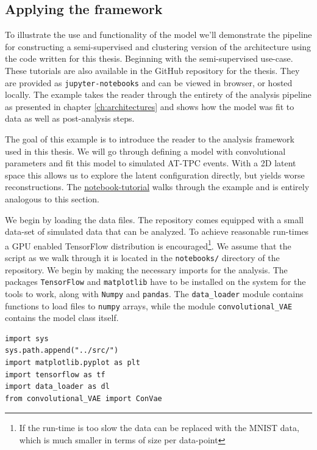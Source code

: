 \subsection{Applying the framework}

To illustrate the use and functionality of the model we'll demonstrate the pipeline for constructing a semi-supervised and clustering version of the architecture using the code written for this thesis. Beginning with the semi-supervised use-case. These tutorials are also available in the GitHub repository for the thesis. They are provided as \lstinline{jupyter-notebooks} and can be viewed in browser, or hosted locally. The example takes the reader through the entirety of the analysis pipeline as presented in chapter \ref{ch:architectures} and shows how the model was fit to data as well as post-analysis steps. 

The goal of this example is to introduce the reader to the analysis framework used in this thesis. We will go through defining a model with convolutional parameters and fit this model to simulated AT-TPC events. With a 2D latent space this allows us to explore the latent configuration directly, but yields worse reconstructions. The \href{https://GitHub.com/ATTPC/VAE-event-classification/blob/master/notebooks/simulated_tutorial.ipynb}{notebook-tutorial} walks through the example and is entirely analogous to this section.

We begin by loading the data files. The repository comes equipped with a small data-set of simulated data that can be analyzed. To achieve reasonable run-times a GPU enabled TensorFlow distribution is encouraged\footnote{If the run-time is too slow the data can be replaced with the MNIST data, which is much smaller in terms of size per data-point}. We assume that the script as we walk through it is located in the \lstinline{notebooks/} directory of the repository. We begin by making the necessary imports for the analysis. The packages \lstinline{TensorFlow} and \lstinline{matplotlib} have to be installed on the system for the tools to work, along with \lstinline{Numpy} and \lstinline{pandas}. The \lstinline{data_loader} module contains functions to load files to \lstinline{numpy} arrays, while the module \lstinline{convolutional_VAE} contains the model class itself.

\begin{minipage}{\linewidth}
\begin{lstlisting}[language=iPython]
import sys
sys.path.append("../src/")
import matplotlib.pyplot as plt
import tensorflow as tf
import data_loader as dl
from convolutional_VAE import ConVae
\end{lstlisting}
\end{minipage}

